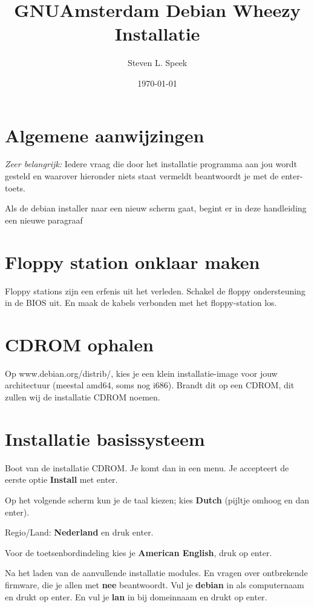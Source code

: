 \documentclass[12pt,a4paper]{article}
\begin{document}
\graphicspath{ {./images/} }
\lstset{language=bash}      
\author{Steven L. Speek}
\title{GNUAmsterdam Debian Wheezy Installatie}
\date{\today}
\maketitle
{}
\section{Algemene aanwijzingen}
\emph{Zeer belangrijk:} Iedere vraag die door het installatie programma aan jou wordt gesteld en waarover hieronder niets staat vermeldt beantwoordt je met de enter-toets.

Als de debian installer naar een nieuw scherm gaat, begint er in deze handleiding een nieuwe paragraaf
\section{Floppy station onklaar maken}
Floppy stations zijn een erfenis uit het verleden. Schakel de floppy ondersteuning in de BIOS uit. En maak de kabels verbonden met het floppy-station los.
\section{CDROM ophalen}
Op www.debian.org/distrib/, kies je een klein installatie-image voor jouw architectuur (meestal amd64, soms nog i686).
Brandt dit op een CDROM, dit zullen wij de installatie CDROM noemen.
\section{Installatie basissysteem}
Boot van de installatie CDROM. Je komt dan in een menu.
Je accepteert de eerste optie \textbf{Install} met enter.

Op het volgende scherm kun je de taal kiezen; kies \textbf{Dutch} (pijltje omhoog en dan enter).

Regio/Land: \textbf{Nederland} en druk enter.

Voor de toetsenbordindeling kies je \textbf{American English}, druk op enter.

Na het laden van de aanvullende installatie modules. En vragen over ontbrekende firmware, die je allen met \textbf{nee} beantwoordt. Vul je \textbf{debian} in als computernaam en drukt op enter.
En vul je \textbf{lan} in bij domeinnaam en drukt op enter.
\end{document}
